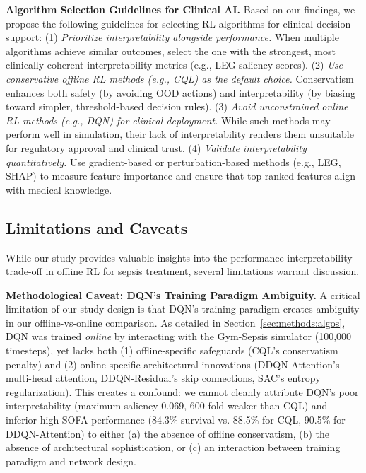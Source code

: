 \textbf{Algorithm Selection Guidelines for Clinical AI.} Based on our findings, we propose the following guidelines for selecting RL algorithms for clinical decision support: (1) \textit{Prioritize interpretability alongside performance.} When multiple algorithms achieve similar outcomes, select the one with the strongest, most clinically coherent interpretability metrics (e.g., LEG saliency scores). (2) \textit{Use conservative offline RL methods (e.g., CQL) as the default choice.} Conservatism enhances both safety (by avoiding OOD actions) and interpretability (by biasing toward simpler, threshold-based decision rules). (3) \textit{Avoid unconstrained online RL methods (e.g., DQN) for clinical deployment.} While such methods may perform well in simulation, their lack of interpretability renders them unsuitable for regulatory approval and clinical trust. (4) \textit{Validate interpretability quantitatively.} Use gradient-based or perturbation-based methods (e.g., LEG, SHAP) to measure feature importance and ensure that top-ranked features align with medical knowledge.


\subsection{Limitations and Caveats}\label{sec:discussion:limitations}

While our study provides valuable insights into the performance-interpretability trade-off in offline RL for sepsis treatment, several limitations warrant discussion.

\textbf{Methodological Caveat: DQN's Training Paradigm Ambiguity.} A critical limitation of our study design is that DQN's training paradigm creates ambiguity in our offline-vs-online comparison. As detailed in Section~\ref{sec:methods:algos}, DQN was trained \textit{online} by interacting with the Gym-Sepsis simulator (100,000 timesteps), yet lacks both (1) offline-specific safeguards (CQL's conservatism penalty) and (2) online-specific architectural innovations (DDQN-Attention's multi-head attention, DDQN-Residual's skip connections, SAC's entropy regularization). This creates a confound: we cannot cleanly attribute DQN's poor interpretability (maximum saliency 0.069, 600-fold weaker than CQL) and inferior high-SOFA performance (84.3\% survival vs. 88.5\% for CQL, 90.5\% for DDQN-Attention) to either (a) the absence of offline conservatism, (b) the absence of architectural sophistication, or (c) an interaction between training paradigm and network design.

